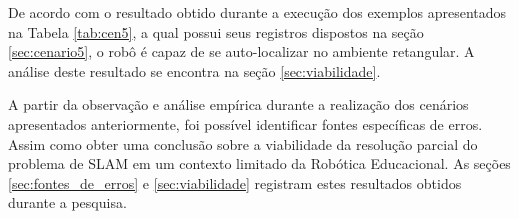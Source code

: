 De acordo com o resultado obtido durante a execução dos exemplos apresentados na Tabela \ref{tab:cen5}, a qual possui seus registros
dispostos na seção \ref{sec:cenario5}, o robô é capaz de se auto-localizar no ambiente retangular. A análise deste resultado se encontra
na seção \ref{sec:viabilidade}.

A partir da observação e análise empírica durante a realização dos cenários apresentados anteriormente, foi possível identificar
fontes específicas de erros. Assim como obter uma conclusão sobre a viabilidade da resolução parcial do problema de SLAM em um contexto
limitado da Robótica Educacional. As seções \ref{sec:fontes_de_erros} e \ref{sec:viabilidade} registram estes resultados obtidos durante
a pesquisa.
